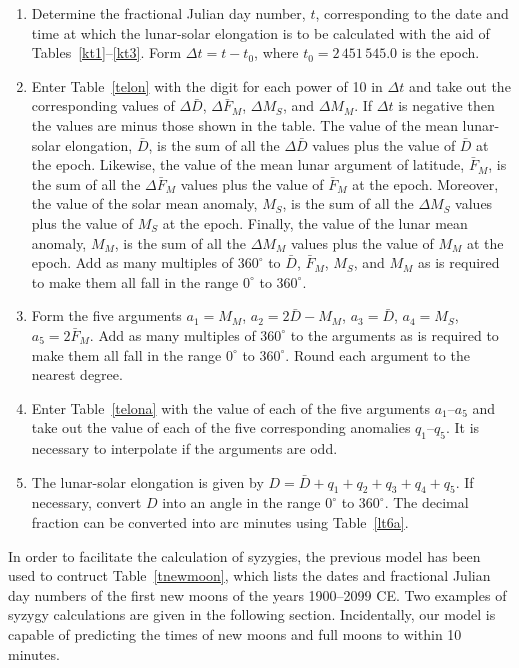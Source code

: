 \begin{enumerate}

 \item Determine the fractional Julian day number, $t$, corresponding to the date and time
at which the lunar-solar elongation is to be calculated with the aid of Tables~\ref{kt1}--\ref{kt3}. Form $\Delta t = t-t_0$, where $t_0=2\,451\,545.0$ is the epoch. 

\item Enter Table~\ref{telon} with the digit for each power of 10
in ${\Delta} t$ and take out the corresponding values of $\Delta \bar{D}$, $\Delta \bar{F}_M$,
 $\Delta M_S$, and $\Delta M_M$. If $\Delta t$ is negative then the 
values are minus those shown in the table.
The value of the mean lunar-solar elongation, $\bar{D}$, is the
sum of all the $\Delta\bar{D}$ values plus the value of $\bar{D}$ at the epoch.
Likewise, the value of the mean lunar argument of latitude, $\bar{F}_M$, is the
sum of all the $\Delta\bar{F}_M$ values plus the value of $\bar{F}_M$ at the epoch. Moreover, the value of the solar mean  anomaly, $M_S$, is
the sum of all the $\Delta M_S$ values plus the value of $M_S$ at the epoch. Finally, the value
of the lunar mean anomaly, $M_M$, is the
sum of all the $\Delta M_M$ values plus the value of $M_M$ at the epoch. 
Add as many multiples of $360^\circ$ to $\bar{D}$, $\bar{F}_M$, $M_S$, and $M_M$
as is required to make them all fall in the range $0^\circ$ to $360^\circ$. 

\item Form the five arguments $a_1=M_M$, $a_2=2\bar{D} - M_M$, $a_3=\bar{D}$, $a_4 = M_S$, $a_5=2\bar{F}_M$. Add as
many multiples of $360^\circ$ to the arguments as is required to make them all fall in the range
$0^\circ$ to $360^\circ$. Round each argument to the nearest degree.

\item Enter Table~\ref{telona} with the value of each of the five arguments $a_1$--$a_5$ and take out the
value of each of the five corresponding anomalies $q_1$--$q_5$. It is necessary to interpolate if the arguments are odd.

\item The lunar-solar elongation is given by $D=\bar{D} + q_1+q_2+q_3+q_4+q_5$.
If necessary, convert $D$ into an angle in the range $0^\circ$ to $360^\circ$. 
The decimal fraction can be converted into arc minutes
using Table~\ref{lt6a}. 
\end{enumerate}

In order to facilitate the calculation of syzygies, the previous model has been used to contruct Table~\ref{tnewmoon}, which lists
the dates and fractional Julian day numbers of the first new moons of the years 1900--2099 CE. Two examples
of syzygy calculations are given in the following section. Incidentally, our model is capable of predicting the times of new moons and full moons to within 10 minutes. 

